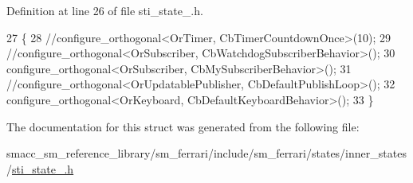 Definition at line 26 of file sti\+\_\+state\+\_.\+h.


\begin{DoxyCode}
27   \{
28     \textcolor{comment}{//configure\_orthogonal<OrTimer, CbTimerCountdownOnce>(10);}
29     \textcolor{comment}{//configure\_orthogonal<OrSubscriber, CbWatchdogSubscriberBehavior>();}
30     configure\_orthogonal<OrSubscriber, CbMySubscriberBehavior>();
31     \textcolor{comment}{//configure\_orthogonal<OrUpdatablePublisher, CbDefaultPublishLoop>();}
32     configure\_orthogonal<OrKeyboard, CbDefaultKeyboardBehavior>();
33   \}
\end{DoxyCode}


The documentation for this struct was generated from the following file\+:\begin{DoxyCompactItemize}
\item 
smacc\+\_\+sm\+\_\+reference\+\_\+library/sm\+\_\+ferrari/include/sm\+\_\+ferrari/states/inner\+\_\+states/\hyperlink{sm__ferrari_2include_2sm__ferrari_2states_2inner__states_2sti__state__3_8h}{sti\+\_\+state\+\_.\+h}\end{DoxyCompactItemize}
